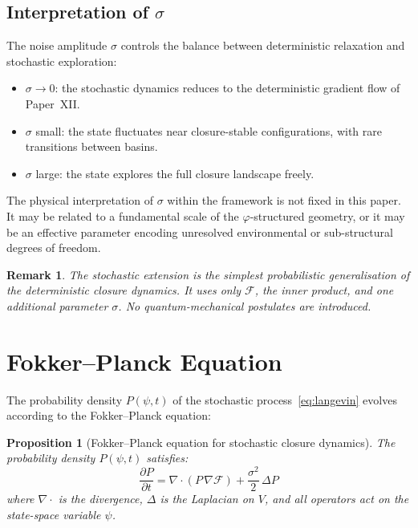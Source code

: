 \documentclass[12pt]{article}
\newtheorem{proposition}[theorem]{Proposition}
\newtheorem{remark}[theorem]{Remark}
\newcommand{\Fcal}{\mathcal{F}}
\newcommand{\phig}{\varphi}
\begin{document}
\subsection{Interpretation of $\sigma$}

The noise amplitude $\sigma$ controls the balance between deterministic relaxation and stochastic exploration:
\begin{itemize}
    \item $\sigma \to 0$: the stochastic dynamics reduces to the deterministic gradient flow of Paper~XII.
    \item $\sigma$ small: the state fluctuates near closure-stable configurations, with rare transitions between basins.
    \item $\sigma$ large: the state explores the full closure landscape freely.
\end{itemize}

The physical interpretation of $\sigma$ within the framework is not fixed in this paper. It may be related to a fundamental scale of the $\phig$-structured geometry, or it may be an effective parameter encoding unresolved environmental or sub-structural degrees of freedom.

\begin{remark}
The stochastic extension is the simplest probabilistic generalisation of the deterministic closure dynamics. It uses only $\Fcal$, the inner product, and one additional parameter $\sigma$. No quantum-mechanical postulates are introduced.
\end{remark}

\section{Fokker--Planck Equation}\label{sec:FP}

The probability density $P(\psi, t)$ of the stochastic process~\eqref{eq:langevin} evolves according to the Fokker--Planck equation:

\begin{proposition}[Fokker--Planck equation for stochastic closure dynamics]\label{prop:FP}
The probability density $P(\psi, t)$ satisfies:
\begin{equation}\label{eq:FP}
    \frac{\partial P}{\partial t} = \nabla \cdot \left(P\, \nabla\Fcal\right) + \frac{\sigma^2}{2}\, \Delta P
\end{equation}
where $\nabla \cdot$ is the divergence, $\Delta$ is the Laplacian on $V$, and all operators act on the state-space variable $\psi$.
\end{proposition}
\end{document}
